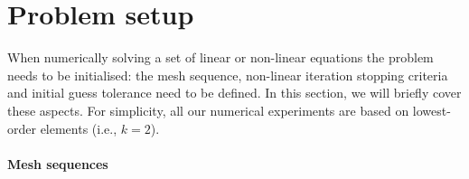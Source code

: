 \section{Problem setup}
\label{sec:ProblemSetup}

When numerically solving a set of linear or non-linear equations the problem needs to be initialised: the mesh sequence, non-linear iteration stopping criteria and initial guess tolerance need to be defined. In this section, we will briefly cover these aspects. For simplicity, all our numerical experiments are based on lowest-order elements (i.e., $k=2$).

\paragraph{Mesh sequences} ~\\

\vspace{-5mm}


